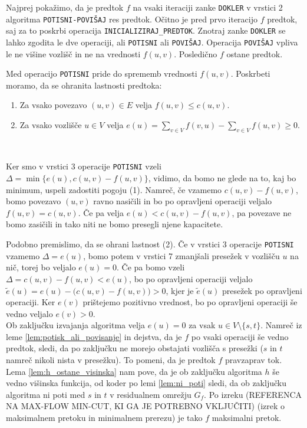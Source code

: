 \documentclass[mat1]{fmfdelo}
\begin{document}
\begin{dokaz}
Najprej pokažimo, da je predtok $f$ na vsaki iteraciji zanke \texttt{DOKLER} v vrstici 2 algoritma \texttt{POTISNI-POVIŠAJ} res predtok. Očitno je pred prvo iteracijo $f$ predtok, saj za to poskrbi operacija \texttt{INICIALIZIRAJ\_PREDTOK}. Znotraj zanke \texttt{DOKLER} se lahko zgodita le dve operaciji, ali \texttt{POTISNI} ali \texttt{POVIŠAJ}. Operacija \texttt{POVIŠAJ} vpliva le ne višine vozlišč in ne na vrednosti $f(u,v)$. Posledično $f$ ostane predtok.

Med operacijo \texttt{POTISNI} pride do sprememb vrednosti $f(u,v)$. Poskrbeti moramo, da se ohranita lastnosti predtoka:\\

\begin{enumerate}
\item Za vsako povezavo $(u,v) \in E$ velja $f(u,v) \leq c(u,v)$.
\item Za vsako vozlišče $u \in V$ velja $e(u) = \sum_{v\in V} f(v,u) - \sum_{v\in V} f(u,v) \geq 0$.
\end{enumerate}~

Ker smo v vrstici 3 operacije \texttt{POTISNI} vzeli $\Delta = \min\{e(u), c(u,v) - f(u,v)\}$, vidimo, da bomo ne glede na to, kaj bo minimum, uspeli zadostiti pogoju (1). Namreč, če vzamemo $c(u,v) - f(u,v)$, bomo povezavo $(u,v)$ ravno nasičili in bo po opravljeni operaciji veljalo $f(u,v) = c(u,v)$. Če pa velja $e(u) < c(u,v) - f(u,v)$, pa povezave ne bomo zasičili in tako niti ne bomo presegli njene kapacitete.

Podobno premislimo, da se ohrani lastnost (2). Če v vrstici 3 operacije \texttt{POTISNI} vzamemo $\Delta = e(u)$, bomo potem v vrstici 7 zmanjšali presežek v vozlišču $u$ na nič, torej bo veljalo $e(u) = 0$. Če pa bomo vzeli $\Delta = c(u,v) - f(u,v) < e(u)$, bo po opravljeni operaciji veljalo $\tilde{e}(u) = e(u) - \big(c(u,v) - f(u,v)\big) > 0$, kjer je $\tilde{e}(u)$ presežek po opravljeni operaciji. Ker $e(v)$ prištejemo pozitivno vrednost, bo po opravljeni operaciji še vedno veljalo $e(v) > 0$.\\

Ob zaključku izvajanja algoritma velja $e(u) = 0$ za vsak $u \in V\setminus \{s,t\}$. Namreč iz leme \ref{lem:potisk_ali_povisanje} in dejstva, da je $f$ po vsaki operaciji še vedno predtok, sledi, da po zaključku ne morejo obstajati vozlišča s presežki ($s$ in $t$ namreč nikoli nista v presežku). To pomeni, da je predtok $f$ pravzaprav tok. Lema \ref{lem:h_ostane_visinska} nam pove, da je ob zaključku algoritma $h$ še vedno višinska funkcija, od koder po lemi \ref{lem:ni_poti} sledi, da ob zaključku algoritma ni poti med $s$ in $t$ v residualnem omrežju $G_f$. Po izreku (REFERENCA NA MAX-FLOW MIN-CUT, KI GA JE POTREBNO VKLJUČITI) (izrek o maksimalnem pretoku in minimalnem prerezu) je tako $f$ maksimalni pretok.
\end{dokaz}
\end{document}
